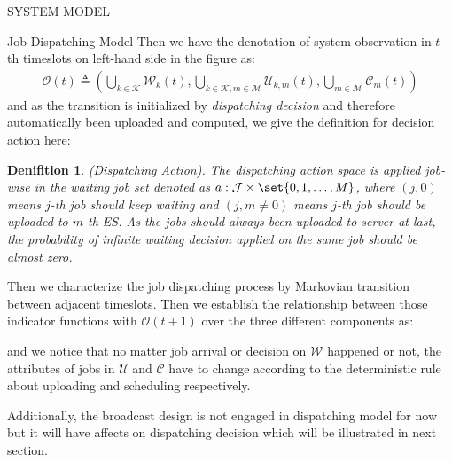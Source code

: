 \documentclass[10pt, conference, letterpaper]{IEEEtran}
\newtheorem{definition}{Denifition}
\DeclarePairedDelimiter\set\{\}
\newcommand{\apSet}{\mathcal{K}}
\newcommand{\esSet}{\mathcal{M}}
\newcommand{\jSet}{\mathcal{J}}
\newcommand{\wSet}{\mathcal{W}}
\newcommand{\uSet}{\mathcal{U}}
\newcommand{\cSet}{\mathcal{C}}
\begin{document}
\begin{section}{SYSTEM MODEL}
\begin{subsection}{Job Dispatching Model}
            Then we have the denotation of system observation in $t$-th timeslots on left-hand side in the figure as:
            \begin{align}
                \mathcal{O}(t) \triangleq (\bigcup\limits_{k\in\apSet}\wSet_{k}(t), \bigcup\limits_{k\in\apSet, m\in\esSet}\uSet_{k,m}(t), \bigcup\limits_{m\in\esSet}\cSet_{m}(t))
            \end{align}
            and as the transition is initialized by \emph{dispatching decision} and therefore automatically been uploaded and computed, we give the definition for decision action here:
            \begin{definition}
                (Dispatching Action).
                The dispatching action space is applied job-wise in the waiting job set denoted as $a: \jSet \times \set{0,1,\dots,M}$, where $(j, 0)$ means $j$-th job should keep waiting and $(j,m\neq0)$ means $j$-th job should be uploaded to $m$-th ES. As the jobs should always been uploaded to server at last, the probability of infinite waiting decision applied on the same job should be almost zero.
            \end{definition}

            Then we characterize the job dispatching process by Markovian transition between adjacent timeslots.
            Then we establish the relationship between those indicator functions with $\mathcal{O}(t+1)$ over the three different components as:

            and we notice that no matter job arrival or decision on $\wSet$ happened or not, the attributes of jobs in $\uSet$ and $\cSet$ have to change according to the deterministic rule about uploading and scheduling respectively.

            Additionally, the broadcast design is not engaged in dispatching model for now but it will have affects on dispatching decision which will be illustrated in next section.
        \end{subsection}
    \end{section}
\end{document}
